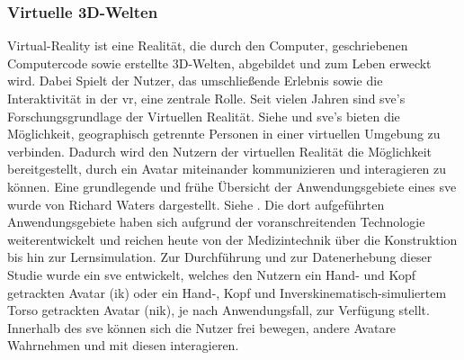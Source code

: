 \documentclass[a4paper,11pt]{article}%
\renewcommand{\\}{\vspace*{0.5\baselineskip} \newline}
\begin{document}
		\subsubsection{Virtuelle 3D-Welten}
Virtual-Reality ist eine Realität, die durch den Computer, geschriebenen Computercode sowie erstellte 3D-Welten, abgebildet und zum Leben erweckt wird. Dabei Spielt der Nutzer, das umschließende Erlebnis sowie die Interaktivität in der \ac{vr}, eine zentrale Rolle. \citep[p.6-12]{sherman2018understanding}
	Seit vielen Jahren sind \ac{sve}'s Forschungsgrundlage der Virtuellen Realität. Siehe \citep{shuffler2011there} \citep{steed1999leadership} und \citep{de2011level} \\
	\ac{sve}'s bieten die Möglichkeit, geographisch getrennte Personen in einer virtuellen Umgebung zu verbinden. Dadurch wird den Nutzern der virtuellen Realität die Möglichkeit bereitgestellt, durch ein Avatar miteinander kommunizieren und interagieren zu können. \citep[p. 1-3]{pettifer1999designing} Eine grundlegende und frühe Übersicht der Anwendungsgebiete eines \ac{sve} wurde von Richard Waters dargestellt. Siehe \citep{waters1997rise}. Die dort aufgeführten Anwendungsgebiete haben sich aufgrund der voranschreitenden Technologie weiterentwickelt und reichen heute von der Medizintechnik über die Konstruktion bis hin zur Lernsimulation.
	Zur Durchführung und zur Datenerhebung dieser Studie wurde ein \ac{sve} entwickelt, welches den Nutzern ein \dq{}Hand- und Kopf getrackten Avatar\dq{} (\ac{ik}) oder ein \dq{}Hand-, Kopf und Inverskinematisch-simuliertem Torso getrackten Avatar\dq{} (\ac{nik}), je nach Anwendungsfall, zur Verfügung stellt. Innerhalb des \ac{sve} können sich die Nutzer frei bewegen, andere Avatare Wahrnehmen und mit diesen interagieren.
	
	
\end{document}
